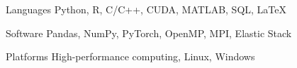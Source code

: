 

\begin{cvskills}

  \cvskill
  {Languages} %
  {Python, R, C/C++, CUDA, MATLAB, SQL, LaTeX} %

  \cvskill
  {Software} %
  {Pandas, NumPy, PyTorch, OpenMP, MPI, Elastic Stack} %

  \cvskill
  {Platforms} %
  {High-performance computing, Linux, Windows} %



\end{cvskills}
